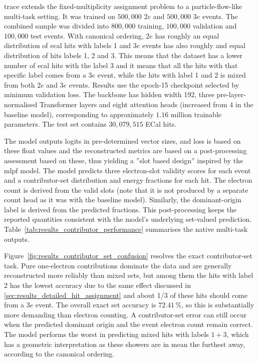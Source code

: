 \gls{trace} extends the fixed-multiplicity
assignment problem to a particle-flow-like multi-task setting. It was trained
on \(500{,}000\) \(2e\) and \(500{,}000\) \(3e\) events. The combined sample
was divided into \(800{,}000\) training, \(100{,}000\) validation and
\(100{,}000\) test events. With canonical ordering, $2e$ has roughly an equal distribution of \gls{ecal} hits with labels 1 and $3e$ events has also roughly and equal distribution of hits labels 1, 2 and 3. This means that the dataset has a lower number of \gls{ecal} hits with the label 3 and it means that all the hits with that specific label comes from a $3e$ event, while the hits with label 1 and 2 is mixed from both $2e$ and $3e$ events. Results use the epoch-15 checkpoint selected by
minimum validation loss. The
backbone has hidden width 192, three pre-layer-normalised Transformer layers
and eight attention heads (increased from 4 in the baseline model), corresponding to approximately \(1.16\) million
trainable parameters. The test set contains \(30{,}079{,}515\) ECal hits.

The model outputs logits in pre-determined vector sizes, and loss is based on these float values and the reconstructed metrics are based on a post-processing assessment based on these, thus yielding a ''slot based design'' inspired by the \gls{mlpf} model. The model predicts three electron-slot validity scores for each event and a
contributor-set distribution and energy fractions for each hit. The electron
count is derived from the valid slots (note that it is not produced by a separate count head as it was with the baseline model). Similarly, the dominant-origin label is derived from the predicted fractions. This post-processing keeps the reported quantities consistent with the model's underlying set-valued prediction. Table~\ref{tab:results_contributor_performance} summarises the native multi-task outputs.



Figure~\ref{fig:results_contributor_set_confusion} resolves the exact
contributor-set task. Pure one-electron contributions dominate the data and
are generally reconstructed more reliably than mixed sets, but among them the hits with label 2 has the lowest accuracy due to the same effect discussed in \ref{sec:results_detailed_hit_assignment} and about 1/3 of these hits should come from a $3e$ event. The overall exact
set accuracy is \(72.41\,\%\), so this is substantially more demanding than
electron counting. 
A contributor-set error can still occur when the predicted dominant origin and the event electron count remain correct. The model performs the worst in predicting mixed hits with labels $1 + 3$, which has a geometric interpretation as these showers are in mean the furthest away, according to the canonical ordering. 

